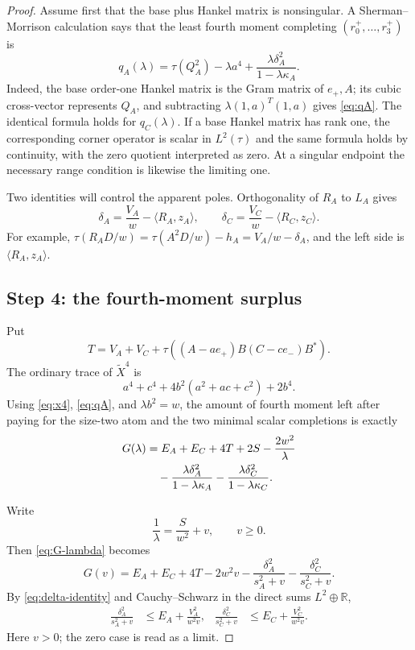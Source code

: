 \documentclass[11pt]{article}
\newcommand{\R}{\mathbb R}
\newcommand{\ip}[2]{\langle #1,#2\rangle}
\begin{document}
\begin{proof}
Assume first that the base plus Hankel matrix is nonsingular.  A
Sherman--Morrison calculation says that the least fourth moment completing
$(r_0^+,\ldots,r_3^+)$ is
\begin{equation}\label{eq:qA}
 q_A(\lambda)=\tau(Q_A^2)-\lambda a^4
 +\frac{\lambda\delta_A^2}{1-\lambda\kappa_A}.
\end{equation}
Indeed, the base order-one Hankel matrix is the Gram matrix of
$e_+,A$; its cubic cross-vector represents $Q_A$, and subtracting
$\lambda(1,a)^T(1,a)$ gives \eqref{eq:qA}.  The identical formula holds for
$q_C(\lambda)$.  If a base Hankel matrix has rank one, the corresponding
corner operator is scalar in $L^2(\tau)$ and the same formula holds by
continuity, with the zero quotient interpreted as zero.  At a singular
endpoint the necessary range condition is likewise the limiting one.

Two identities will control the apparent poles.  Orthogonality of $R_A$ to
$L_A$ gives
\begin{equation}\label{eq:delta-identity}
 \delta_A=\frac{V_A}{w}-\ip{R_A}{z_A},
 \qquad
 \delta_C=\frac{V_C}{w}-\ip{R_C}{z_C}.
\end{equation}
For example,
$\tau(R_AD/w)=\tau(A^2D/w)-h_A=V_A/w-\delta_A$, and the left side is
$\ip{R_A}{z_A}$.

\subsection*{Step 4: the fourth-moment surplus}

Put
\[
 T=V_A+V_C+\tau((A-ae_+)B(C-ce_-)B^*).
\]
The ordinary trace of $\widetilde X^4$ is
\[
 a^4+c^4+4b^2(a^2+ac+c^2)+2b^4.
\]
Using \eqref{eq:x4}, \eqref{eq:qA}, and $\lambda b^2=w$, the amount of
fourth moment left after paying for the size-two atom and the two minimal
scalar completions is exactly
\begin{align}
 G(\lambda)
 &=E_A+E_C+4T+2S-\frac{2w^2}{\lambda}\notag\\
 &\quad-\frac{\lambda\delta_A^2}{1-\lambda\kappa_A}
       -\frac{\lambda\delta_C^2}{1-\lambda\kappa_C}.
 \label{eq:G-lambda}
\end{align}

Write
\[
 \frac1\lambda=\frac S{w^2}+v,\qquad v\geq0.
\]
Then \eqref{eq:G-lambda} becomes
\begin{equation}\label{eq:G-v}
 G(v)=E_A+E_C+4T-2w^2v
 -\frac{\delta_A^2}{s_A^2+v}
 -\frac{\delta_C^2}{s_C^2+v}.
\end{equation}
By \eqref{eq:delta-identity} and Cauchy--Schwarz in the direct sums
$L^2\oplus\R$,
\begin{align}
 \frac{\delta_A^2}{s_A^2+v}
 &\leq E_A+\frac{V_A^2}{w^2v},&
 \frac{\delta_C^2}{s_C^2+v}
 &\leq E_C+\frac{V_C^2}{w^2v}.
 \label{eq:CS}
\end{align}
Here $v>0$; the zero case is read as a limit.


\end{proof}
\end{document}

